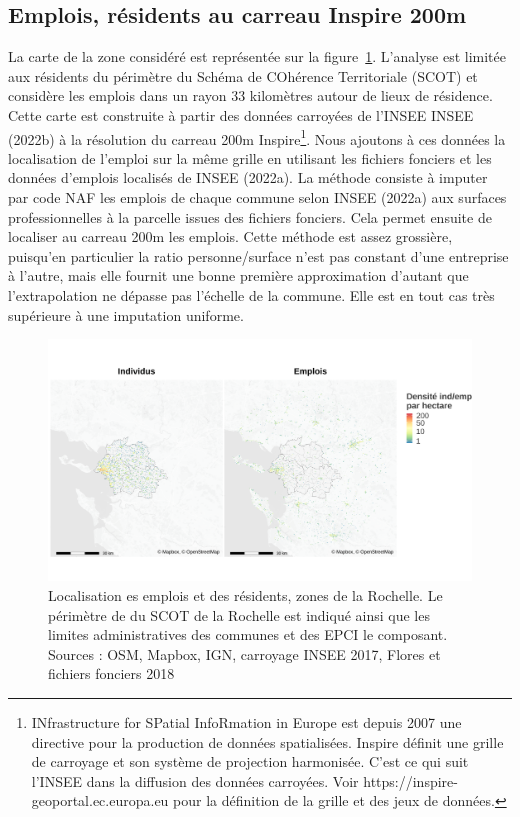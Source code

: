 \documentclass[
  10pt,
  a4paper,
  numbers=noendperiod,
  DIV=9]{scrreprt}
\begin{document}
\hypertarget{emplois-ruxe9sidents-au-carreau-inspire-200m}{%
\subsection{Emplois, résidents au carreau Inspire
200m}\label{emplois-ruxe9sidents-au-carreau-inspire-200m}}

La carte de la zone considéré est représentée sur la
figure~\ref{fig-zoneslr}. L'analyse est limitée aux résidents du
périmètre du Schéma de COhérence Territoriale (SCOT) et considère les
emplois dans un rayon 33 kilomètres autour de lieux de résidence. Cette
carte est construite à partir des données carroyées de l'INSEE INSEE
(2022b) à la résolution du carreau 200m Inspire\footnote{INfrastructure
  for SPatial InfoRmation in Europe est depuis 2007 une directive pour
  la production de données spatialisées. Inspire définit une grille de
  carroyage et son système de projection harmonisée. C'est ce qui suit
  l'INSEE dans la diffusion des données carroyées. Voir
  https://inspire-geoportal.ec.europa.eu pour la définition de la grille
  et des jeux de données.}. Nous ajoutons à ces données la localisation
de l'emploi sur la même grille en utilisant les fichiers fonciers et les
données d'emplois localisés de INSEE (2022a). La méthode consiste à
imputer par code NAF les emplois de chaque commune selon INSEE (2022a)
aux surfaces professionnelles à la parcelle issues des fichiers
fonciers. Cela permet ensuite de localiser au carreau 200m les emplois.
Cette méthode est assez grossière, puisqu'en particulier la ratio
personne/surface n'est pas constant d'une entreprise à l'autre, mais
elle fournit une bonne première approximation d'autant que
l'extrapolation ne dépasse pas l'échelle de la commune. Elle est en tout
cas très supérieure à une imputation uniforme.

\begin{figure}[htb]

{\centering \includegraphics[width=1\textwidth,height=\textheight]{./output/popemp.png}

}

\caption[Localisation des résidents et des
emplois]{\label{fig-zoneslr}Localisation es emplois et des résidents,
zones de la Rochelle. Le périmètre de du SCOT de la Rochelle est indiqué
ainsi que les limites administratives des communes et des EPCI le
composant. Sources : OSM, Mapbox, IGN, carroyage INSEE 2017, Flores et
fichiers fonciers 2018}

\end{figure}
\end{document}
